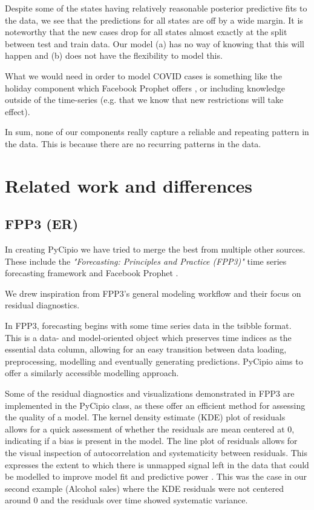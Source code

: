 \documentclass{article}
\begin{document}
\noindent Despite some of the states having relatively reasonable posterior predictive fits to the data, we see that the predictions for all states are off by a wide margin. It is noteworthy that the new cases drop for all states almost exactly at the split between test and train data. Our model (a) has no way of knowing that this will happen and (b) does not have the flexibility to model this. 

\noindent What we would need in order to model COVID cases is something like the holiday component which Facebook Prophet offers \cite{taylor2018forecasting}, or including knowledge outside of the time-series (e.g. that we know that new restrictions will take effect). 

\noindent In sum, none of our components really capture a reliable and repeating pattern in the data. This is because there are no recurring patterns in the data. 


\section{Related work and differences}

\subsection{FPP3 (ER)}

\noindent In creating PyCipio we have tried to merge the best from multiple other sources. These include the \textit{"Forecasting: Principles and Practice (FPP3)"} time series forecasting framework \cite{fpp3} and Facebook Prophet \cite{taylor2018forecasting}.

\noindent We drew inspiration from FPP3’s general modeling workflow and their focus on residual diagnostics. 

\noindent In FPP3, forecasting begins with some time series data in the tsibble format. This is a data- and model-oriented object which preserves time indices as the essential data column, allowing for an easy transition between data loading, preprocessing, modelling and eventually generating predictions. PyCipio aims to offer a similarly accessible modelling approach. 

\noindent Some of the residual diagnostics and visualizations demonstrated in FPP3 are implemented in the PyCipio class, as these offer an efficient method for assessing the quality of a model.
The kernel density estimate (KDE) plot of residuals allows for a quick assessment of whether the residuals are mean centered at 0, indicating if a bias is present in the model. The line plot of residuals allows for the visual inspection of autocorrelation and systematicity between residuals. This expresses the extent to which there is unmapped signal left in the data that could be modelled to improve model fit and predictive power \cite{fpp3}. This was the case in our second example (Alcohol sales) where the KDE residuals were not centered around 0 and the residuals over time showed systematic variance. 
\end{document}
